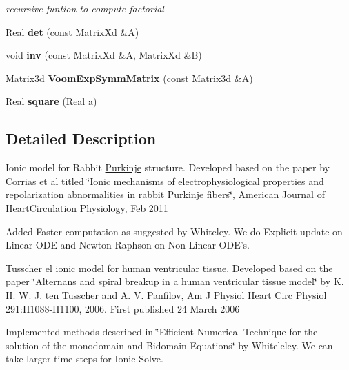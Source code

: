 \begin{DoxyCompactItemize}
\begin{DoxyCompactList}\small\item\em recursive funtion to compute factorial \item\end{DoxyCompactList}\item 
\hypertarget{namespacevoom_a402e7c86d4406c26e19717211a78f9af}{
Real {\bfseries det} (const MatrixXd \&A)}
\label{namespacevoom_a402e7c86d4406c26e19717211a78f9af}

\item 
\hypertarget{namespacevoom_a706ccce499faf4d752ef32a1607f1973}{
void {\bfseries inv} (const MatrixXd \&A, MatrixXd \&B)}
\label{namespacevoom_a706ccce499faf4d752ef32a1607f1973}

\item 
\hypertarget{namespacevoom_a21bda4dc298c1ce21afc90ac8b7ff617}{
Matrix3d {\bfseries VoomExpSymmMatrix} (const Matrix3d \&A)}
\label{namespacevoom_a21bda4dc298c1ce21afc90ac8b7ff617}

\item 
\hypertarget{namespacevoom_ad79c23f3d8d827d5b671afa1c5f8c028}{
Real {\bfseries square} (Real a)}
\label{namespacevoom_ad79c23f3d8d827d5b671afa1c5f8c028}

\end{DoxyCompactItemize}


\subsection{Detailed Description}
Ionic model for Rabbit \hyperlink{classvoom_1_1_purkinje}{Purkinje} structure. Developed based on the paper by Corrias et al titled \char`\"{}Ionic mechanisms of electrophysiological properties 
  and repolarization abnormalities in rabbit Purkinje fibers\char`\"{}, American Journal of HeartCirculation Physiology, Feb 2011
\begin{DoxyItemize}
\item Added Faster computation as suggested by Whiteley. We do Explicit update on Linear ODE and Newton-\/Raphson on Non-\/Linear ODE's. 
\end{DoxyItemize}\hyperlink{classvoom_1_1_tusscher}{Tusscher} el ionic model for human ventricular tissue. Developed based on the paper \char`\"{}Alternans and spiral breakup in a human ventricular tissue model\char`\"{} by K. H. W. J. ten \hyperlink{classvoom_1_1_tusscher}{Tusscher} and A. V. Panfilov, Am J Physiol Heart Circ Physiol 291:H1088-\/H1100, 2006. First published 24 March 2006
\begin{DoxyItemize}
\item Implemented methods described in \char`\"{}Efficient Numerical Technique for the 
  solution of the monodomain and Bidomain Equations\char`\"{} by Whiteleley. We can take larger time steps for Ionic Solve.
\end{DoxyItemize}

